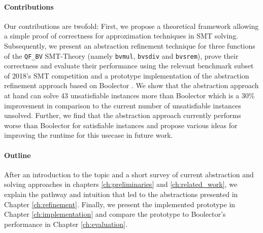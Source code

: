 \paragraph{Contributions}
Our contributions are twofold:
First, we propose a theoretical framework allowing a simple proof of correctness for approximation techniques in SMT solving.
Subsequently, we present an abstraction refinement technique for three functions of the \texttt{QF\_BV} SMT-Theory (namely \texttt{bvmul}, \texttt{bvsdiv} and \texttt{bvsrem}), prove their correctness and evaluate their performance using the relevant benchmark subset of 2018's SMT competition \cite{SMTCOMP18} and a prototype implementation of the abstraction refinement approach based on Boolector \cite{NiemetzPreinerBiere-JSAT15}.
We show that the abstraction approach at hand can solve 43 unsatisfiable instances more than Boolector which is a $30\%$ improvement in comparison to the current number of unsatisfiable instances unsolved. Further, we find that the abstraction approach currently performs worse than Boolector for satisfiable instances and propose various ideas for improving the runtime for this usecase in future work.


\paragraph{Outline}
After an introduction to the topic and a short survey of current abstraction and solving approaches in chapters \ref{ch:preliminaries} and \ref{ch:related_work}, we explain the pathway and intuition that led to the abstractions presented in Chapter \ref{ch:refinement}. Finally, we present the implemented prototype in Chapter \ref{ch:implementation} and compare the prototype to Boolector's performance in Chapter \ref{ch:evaluation}.
